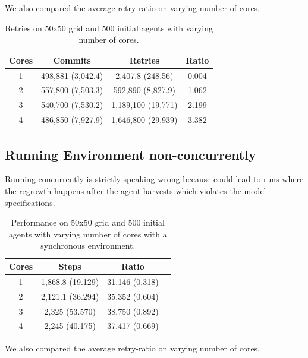 We also compared the average retry-ratio on varying number of cores.

\begin{table}
	\centering
  	\begin{tabular}{ c || c | c | c }
        Cores & Commits           & Retries            & Ratio \\ \hline \hline 
    	1     & 498,881 (3,042.4) & 2,407.8 (248.56)   & 0.004 \\ \hline
   		2     & 557,800 (7,503.3) & 592,890 (8,827.9)  & 1.062 \\ \hline
   		3     & 540,700 (7,530.2) & 1,189,100 (19,771) & 2.199 \\ \hline
   		4     & 486,850 (7,927.9) & 1,646,800 (29,939) & 3.382 \\ \hline
   	\end{tabular}
  	
  	\caption{Retries on 50x50 grid and 500 initial agents with varying number of cores.}
	\label{tab:naive_results_retries}
\end{table}

\subsection{Running Environment non-concurrently}
Running concurrently is strictly speaking wrong because could lead to runs where the regrowth happens after the agent harvests which violates the model specifications. 

\begin{table}
	\centering
  	\begin{tabular}{ c || c | c | c }
        Cores & Steps            & Ratio           \\ \hline \hline 
    	1     & 1,868.8 (19.129) & 31.146 (0.318) \\ \hline
   		2     & 2,121.1 (36.294) & 35.352 (0.604) \\ \hline
   		3     & 2,325 (53.570)   & 38.750 (0.892) \\ \hline
   		4     & 2,245 (40.175)   & 37.417 (0.669) \\ \hline \hline
   	\end{tabular}
  	
  	\caption{Performance on 50x50 grid and 500 initial agents with varying number of cores with a synchronous environment.}
	\label{tab:naive_results_syncenv_time}
\end{table}

We also compared the average retry-ratio on varying number of cores.

